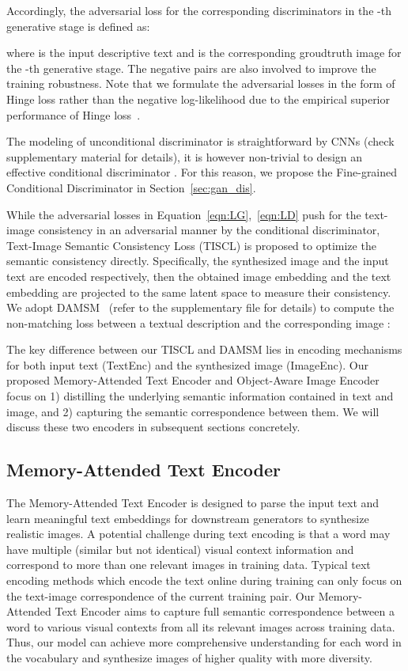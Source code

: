 \documentclass[runningheads]{llncs}
\begin{document}
\noindent
Accordingly, the adversarial loss for the corresponding discriminators in  the -th generative stage is defined as:
\begin{small}

\end{small}

\noindent
where  is the input descriptive text and  is the corresponding groudtruth image for the -th generative stage. The negative pairs  are also involved to improve the training robustness. Note that we formulate the adversarial losses in the form of Hinge loss rather than the negative log-likelihood due to the empirical superior performance of Hinge loss~\cite{miyato2018spectral,zhang2018self}. 

\noindent The modeling of unconditional discriminator  is straightforward by CNNs (check supplementary material for details), it is however non-trivial to design an effective conditional discriminator . For this reason, we propose the Fine-grained Conditional Discriminator in Section~\ref{sec:gan_dis}.

\noindent While the adversarial losses in Equation~\ref{eqn:LG},~\ref{eqn:LD} push for the text-image consistency in an adversarial manner by the conditional discriminator, Text-Image Semantic Consistency Loss (TISCL) is proposed to optimize the semantic consistency directly. Specifically, the synthesized image and the input text are encoded respectively, then the obtained image embedding and the text embedding are projected to the same latent space to measure their consistency. We adopt DAMSM~\cite{xu2018attngan} (refer to the supplementary file for details) to compute the non-matching loss between a textual description  and the corresponding image : 

\noindent
The key difference between our TISCL and DAMSM lies in encoding mechanisms for both input text (TextEnc) and the synthesized image (ImageEnc). Our proposed Memory-Attended Text Encoder and Object-Aware Image Encoder focus on 1) distilling the underlying semantic information contained in text and image, and 2) capturing the semantic correspondence between them. We will discuss these two encoders in subsequent sections concretely.

\subsection{Memory-Attended Text Encoder}
\label{sec:text_enc}
The Memory-Attended Text Encoder is designed to parse the input text and learn meaningful text embeddings for downstream generators to synthesize realistic images. A potential challenge during text encoding is that a word may have multiple (similar but not identical) visual context information and correspond to more than one relevant images in training data. Typical text encoding methods which encode the text online during training can only focus on the text-image correspondence of the current training pair. Our Memory-Attended Text Encoder aims to capture full semantic correspondence between a word to various visual contexts from all its relevant images across training data. Thus, our model can achieve more comprehensive understanding for each word in the vocabulary and synthesize images of higher quality with more diversity.
\end{document}
